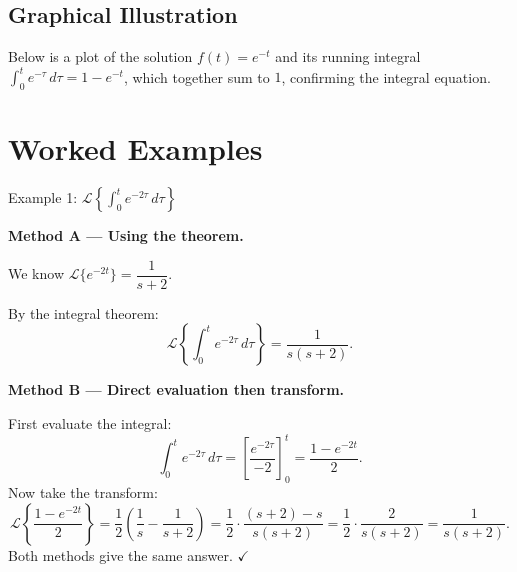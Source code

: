 \documentclass[12pt,a4paper]{article}
\begin{document}
\subsection*{Graphical Illustration}

Below is a plot of the solution $f(t) = e^{-t}$ and its running integral
$\int_0^t e^{-\tau}\,d\tau = 1 - e^{-t}$, which together sum to $1$, confirming the
integral equation.

\begin{center}
\end{center}

\section{Worked Examples}

\begin{infobox}{Example 1: $\mathcal{L}\!\left\{\int_0^t e^{-2\tau}\,d\tau\right\}$}

\textbf{Method A --- Using the theorem.}

We know $\mathcal{L}\{e^{-2t}\} = \dfrac{1}{s+2}$.

By the integral theorem:
\[
  \mathcal{L}\!\left\{\int_0^t e^{-2\tau}\,d\tau\right\} = \frac{1}{s(s+2)}.
\]

\textbf{Method B --- Direct evaluation then transform.}

First evaluate the integral:
\[
  \int_0^t e^{-2\tau}\,d\tau = \left[\frac{e^{-2\tau}}{-2}\right]_0^t
  = \frac{1 - e^{-2t}}{2}.
\]
Now take the transform:
\[
  \mathcal{L}\!\left\{\frac{1 - e^{-2t}}{2}\right\}
  = \frac{1}{2}\left(\frac{1}{s} - \frac{1}{s+2}\right)
  = \frac{1}{2}\cdot\frac{(s+2) - s}{s(s+2)}
  = \frac{1}{2}\cdot\frac{2}{s(s+2)}
  = \frac{1}{s(s+2)}.
\]
Both methods give the same answer. $\checkmark$
\end{infobox}
\end{document}
